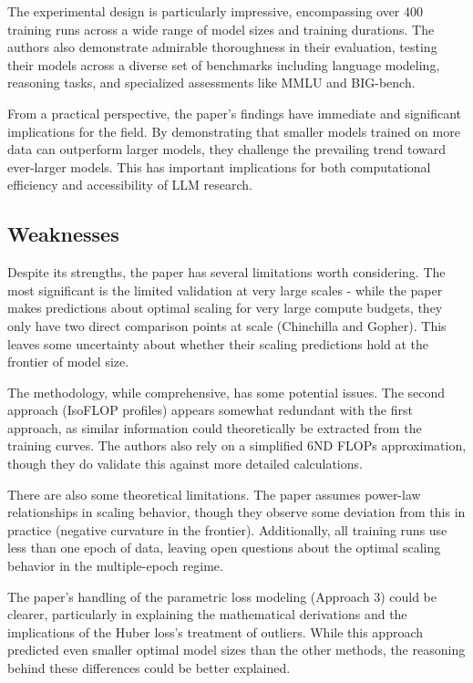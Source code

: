 \documentclass{article}
\begin{document}
The experimental design is particularly impressive, encompassing over 400 training runs across a wide range of model sizes and training durations. The authors also demonstrate admirable thoroughness in their evaluation, testing their models across a diverse set of benchmarks including language modeling, reasoning tasks, and specialized assessments like MMLU and BIG-bench.

From a practical perspective, the paper's findings have immediate and significant implications for the field. By demonstrating that smaller models trained on more data can outperform larger models, they challenge the prevailing trend toward ever-larger models. This has important implications for both computational efficiency and accessibility of LLM research.

\subsection{Weaknesses}
Despite its strengths, the paper has several limitations worth considering. The most significant is the limited validation at very large scales - while the paper makes predictions about optimal scaling for very large compute budgets, they only have two direct comparison points at scale (Chinchilla and Gopher). This leaves some uncertainty about whether their scaling predictions hold at the frontier of model size.

The methodology, while comprehensive, has some potential issues. The second approach (IsoFLOP profiles) appears somewhat redundant with the first approach, as similar information could theoretically be extracted from the training curves. The authors also rely on a simplified 6ND FLOPs approximation, though they do validate this against more detailed calculations.

There are also some theoretical limitations. The paper assumes power-law relationships in scaling behavior, though they observe some deviation from this in practice (negative curvature in the frontier). Additionally, all training runs use less than one epoch of data, leaving open questions about the optimal scaling behavior in the multiple-epoch regime.

The paper's handling of the parametric loss modeling (Approach 3) could be clearer, particularly in explaining the mathematical derivations and the implications of the Huber loss's treatment of outliers. While this approach predicted even smaller optimal model sizes than the other methods, the reasoning behind these differences could be better explained.
\end{document}
